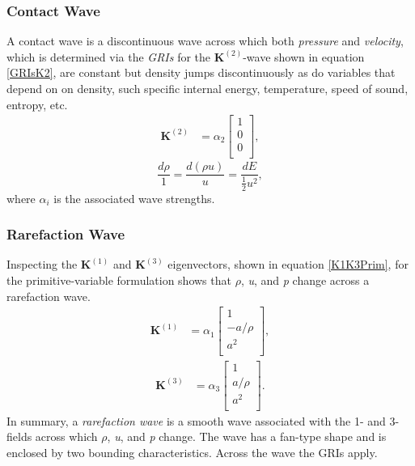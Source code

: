 \documentclass[]{article}
\begin{document}
		\subsubsection{Contact Wave}
			A contact wave is a discontinuous wave across which both \textit{pressure} and \textit{velocity}, which is determined via the \textit{GRIs} for the $ \textbf{K}^{(2)} $-wave shown in equation \ref{GRIsK2}, are constant but density jumps discontinuously as do variables that depend on on density, such specific internal energy, temperature, speed of sound, entropy, etc.
			\begin{align}
				\textbf{K}^(2) &= \alpha_2 \begin{bmatrix}
				1 \\
				0 \\
				0 \\
				\end{bmatrix},
			\end{align}
			\begin{equation}
				\frac{d \rho}{1} = \frac{d(\rho u)}{u} = \frac{dE}{\frac{1}{2}u^2}
				\label{GRIsK2},
			\end{equation}
			where $ \alpha_i $ is the associated wave strengths.
			
		\subsubsection{Rarefaction Wave}		
			Inspecting the $ \textbf{K}^{(1)} $ and  $ \textbf{K}^{(3)} $ eigenvectors, shown in equation \ref{K1K3Prim}, for the primitive-variable formulation shows that $ \rho $, \textit{u}, and \textit{p} change across a rarefaction wave.
			\begin{align}
				\textbf{K}^(1) &= \alpha_1 \begin{bmatrix}
				1 \\
				-a/\rho \\
				a^2 \\
				\end{bmatrix},
			\end{align}
			\begin{align}
				\textbf{K}^(3) &= \alpha_3 \begin{bmatrix}
				1 \\
				a/\rho \\
				a^2 \\
				\end{bmatrix}.
			\end{align}
			In summary, a \textit{rarefaction wave} is a smooth wave associated with the 1- and 3-fields across which $ \rho $, \textit{u}, and \textit{p} change. The wave has a fan-type shape and is enclosed by two bounding characteristics. Across the wave the GRIs apply.
			
\end{document}
